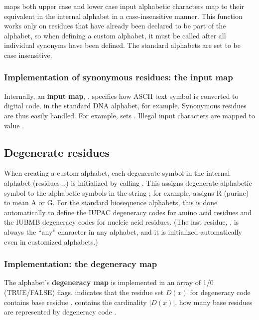  maps both upper case and
lower case input alphabetic characters map to their equivalent in the
internal alphabet in a case-insensitive manner.  This function works
only on residues that have already been declared to be part of the
alphabet, so when defining a custom alphabet, it must be called after
all individual synonyms have been defined. The standard alphabets are
set to be case insensitive.

\subsubsection{Implementation of synonymous residues: the input map}

Internally, an \textbf{input map}, , specifies
how ASCII text symbol is converted to digital
code.  in the standard DNA alphabet, for
example. Synonymous residues are thus easily handled. For example,
 sets
. Illegal input characters are
mapped to value .


\subsection{Degenerate residues}

When creating a custom alphabet, each degenerate symbol in the
internal alphabet (residues ..) is initialized
by calling . This assigns degenerate alphabetic symbol  to the
alphabetic symbols in the string ; for example,
 assigns R
(purine) to mean A or G.  For the standard biosequence alphabets, this
is done automatically to define the IUPAC degeneracy codes for amino
acid residues and the IUBMB degeneracy codes for nucleic acid
residues.  (The last residue, , is always the ``any''
character in any alphabet, and it is initialized automatically even in
customized alphabets.)

\subsubsection{Implementation: the degeneracy map}

The alphabet's \textbf{degeneracy map} is implemented in an array
 of 1/0 (TRUE/FALSE) flags.
 indicates that the residue set $D(x)$
for degeneracy code  contains base residue .
 contains the cardinality $|D(x)|$, how many base
residues are represented by degeneracy code .

